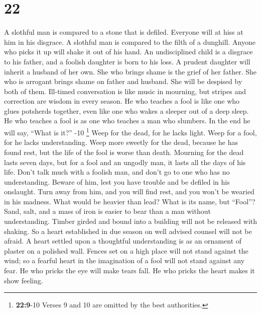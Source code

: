 \hypertarget{section-18}{%
\section{22}\label{section-18}}

 A slothful man is compared to a stone that is defiled.
Everyone will at hiss at him in his disgrace.  A slothful
man is compared to the filth of a dunghill. Anyone who picks it up will
shake it out of his hand.  An undisciplined child is a
disgrace to his father, and a foolish daughter is born to his loss.
 A prudent daughter will inherit a husband of her own. She
who brings shame is the grief of her father.  She who is
arrogant brings shame on father and husband. She will be despised by
both of them.  Ill-timed conversation is like music in
mourning, but stripes and correction are wisdom in every season.
 He who teaches a fool is like one who glues potsherds
together, even like one who wakes a sleeper out of a deep sleep.
 He who teaches a fool is as one who teaches a man who
slumbers. In the end he will say, ``What is it?'' -10
\footnote{\textbf{22:9}-10 Verses 9 and 10 are omitted by the best
  authorities.}  Weep for the dead, for he lacks light.
Weep for a fool, for he lacks understanding. Weep more sweetly for the
dead, because he has found rest, but the life of the fool is worse than
death.  Mourning for the dead lasts seven days, but for a
fool and an ungodly man, it lasts all the days of his life.
 Don't talk much with a foolish man, and don't go to one
who has no understanding. Beware of him, lest you have trouble and be
defiled in his onslaught. Turn away from him, and you will find rest,
and you won't be wearied in his madness.  What would be
heavier than lead? What is its name, but ``Fool''?  Sand,
salt, and a mass of iron is easier to bear than a man without
understanding.  Timber girded and bound into a building
will not be released with shaking. So a heart established in due season
on well advised counsel will not be afraid.  A heart
settled upon a thoughtful understanding is as an ornament of plaster on
a polished wall.  Fences set on a high place will not
stand against the wind; so a fearful heart in the imagination of a fool
will not stand against any fear.  He who pricks the eye
will make tears fall. He who pricks the heart makes it show feeling.
